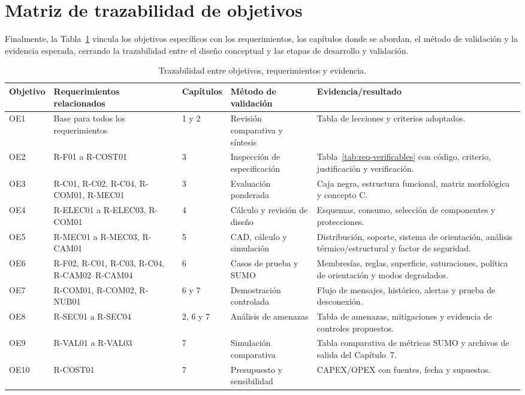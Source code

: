 \section{Matriz de trazabilidad de objetivos}\label{sec:trazabilidad-objetivos}

Finalmente, la Tabla~\ref{tab:trazabilidad} vincula los objetivos específicos con los requerimientos, los
capítulos donde se abordan, el método de validación y la evidencia esperada, cerrando la trazabilidad entre el
diseño conceptual y las etapas de desarrollo y validación.

\begin{landscape}
\begin{table}[!htbp]
\centering
\footnotesize
\centering
\caption{Trazabilidad entre objetivos, requerimientos y evidencia.}\label{tab:trazabilidad}
\begin{tabular}{@{}p{1.3cm}p{4.3cm}p{2.6cm}p{3.7cm}p{7.0cm}@{}}
\toprule
\textbf{Objetivo} & \textbf{Requerimientos relacionados} & \textbf{Capítulos} & \textbf{Método de validación} & \textbf{Evidencia/resultado}\\
\midrule
OE1 & Base para todos los requerimientos & 1 y 2 & Revisión comparativa y síntesis & Tabla de lecciones y criterios adoptados.\\
OE2 & R-F01 a R-COST01 & 3 & Inspección de especificación & Tabla~\ref{tab:req-verificables} con código, criterio, justificación y verificación.\\
OE3 & R-C01, R-C02, R-C04, R-COM01, R-MEC01 & 3 & Evaluación ponderada & Caja negra, estructura funcional, matriz morfológica y concepto C.\\
OE4 & R-ELEC01 a R-ELEC03, R-COM01 & 4 & Cálculo y revisión de diseño & Esquemas, consumo, selección de componentes y protecciones.\\
OE5 & R-MEC01 a R-MEC03, R-CAM01 & 5 & CAD, cálculo y simulación & Distribución, soporte, sistema de orientación, análisis térmico/estructural y factor de seguridad.\\
OE6 & R-F02, R-C01, R-C03, R-C04, R-CAM02--R-CAM04 & 6 & Casos de prueba y SUMO & Membresías, reglas, superficie, saturaciones, política de orientación y modos degradados.\\
OE7 & R-COM01, R-COM02, R-NUB01 & 6 y 7 & Demostración controlada & Flujo de mensajes, histórico, alertas y prueba de desconexión.\\
OE8 & R-SEC01 a R-SEC04 & 2, 6 y 7 & Análisis de amenazas & Tabla de amenazas, mitigaciones y evidencia de controles propuestos.\\
OE9 & R-VAL01 a R-VAL03 & 7 & Simulación comparativa & Tabla comparativa de métricas SUMO y archivos de salida del Capítulo~7.\\
OE10 & R-COST01 & 7 & Presupuesto y sensibilidad & CAPEX/OPEX con fuentes, fecha y supuestos.\\
\bottomrule
\end{tabular}
\end{table}
\end{landscape}
